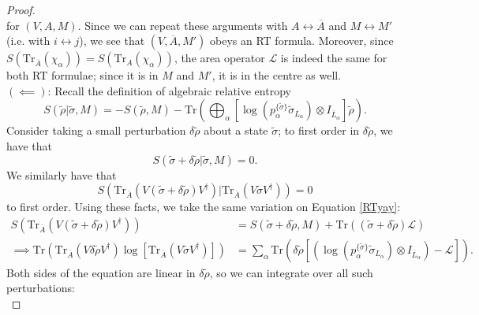 \documentclass[12pt,a4paper]{report}
\numberwithin{equation}{section}
\newcommand{\ol}[1]{\overline{#1}}
\newcommand{\tr}{\text{Tr}}
\theoremstyle{definition}
\theoremstyle{theorem}
\theoremstyle{theorem}
\theoremstyle{example}
\theoremstyle{definition}
\begin{document}
\begin{proof}
\begin{equation}
	\end{equation}
	for $(V,A,M)$. Since we can repeat these arguments with $A\leftrightarrow\ol{A}$ and $M\leftrightarrow M'$ (i.e. with $i\leftrightarrow j$), we see that $(V,\ol{A},M')$ obeys an RT formula. Moreover, since $S\left(\tr_{\ol{A}}\left(\chi_{\alpha}\right)\right)=S\left(\tr_{A}\left(\chi_{\alpha}\right)\right)$, the area operator $\mathcal{L}$ is indeed the same for both RT formulae; since it is in $M$ and $M'$, it is in the centre as well.\\
	$(\impliedby)$: Recall the definition of algebraic relative entropy
	\begin{equation}
		S(\tilde{\rho}|\tilde{\sigma},M)=-S(\tilde{\rho},M)-\tr\left(\bigoplus_{\alpha}\left[\log\left(p_{\alpha}^{\{\tilde{\sigma}\}}\tilde{\sigma}_{L_{\alpha}}\right)\otimes I_{\ol{L}_{\alpha}}\right]\tilde{\rho}\right).
	\end{equation}
	Consider taking a small perturbation $\delta\tilde{\rho}$ about a state $\tilde{\sigma}$; to first order in $\delta\tilde{\rho}$, we have that
	\begin{equation}
		S(\tilde{\sigma}+\delta\tilde{\rho}|\tilde{\sigma},M)=0.
	\end{equation}
	We similarly have that
	\begin{equation}
		S\left(\tr_{\ol{A}}\left(V\left(\tilde{\sigma}+\delta\tilde{\rho}\right)V^{\dagger}\right)|\tr_{\ol{A}}\left(V\tilde{\sigma}V^{\dagger}\right)\right)=0
	\end{equation}
	to first order. Using these facts, we take the same variation on Equation \ref{RTyay}:
	\begin{equation}
		\begin{aligned}
			S\left(\tr_{\ol{A}}\left(V\left(\tilde{\sigma}+\delta\tilde{\rho}\right)V^{\dagger}\right)\right)&=S(\tilde{\sigma}+\delta\tilde{\rho},M)+\tr\left(\left(\tilde{\sigma}+\delta\tilde{\rho}\right)\mathcal{L}\right)\\
			\implies \tr\left(\tr_{\ol{A}}\left(V\delta\tilde{\rho} V^{\dagger}\right)\log\left[\tr_{\ol{A}}\left(V\tilde{\sigma} V^{\dagger}\right)\right]\right)&=\sum_{\alpha}\tr\left(\delta\tilde{\rho}\left[\left(\log\left(p_{\alpha}^{\{\tilde{\sigma}\}}\tilde{\sigma}_{L_{\alpha}}\right)\otimes I_{\ol{L}_{\alpha}}\right)-\mathcal{L}\right]\right).
		\end{aligned}
	\end{equation}
	Both sides of the equation are linear in $\delta\tilde{\rho}$, so we can integrate over all such perturbations:
	\begin{equation}\label{ph}

\end{equation}
\end{proof}
\end{document}
